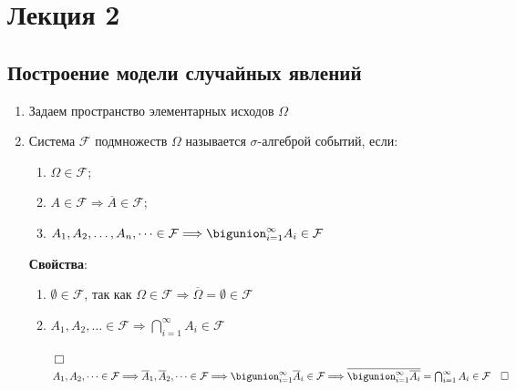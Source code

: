 \documentclass[12pt]{article}
\begin{document}
    \section{Лекция 2}
    
    \subsection{Построение модели случайных явлений}

    \hypertarget{axiomaticdefinitionofprobability}{}

    \begin{enumerate}
        \item Задаем пространство элементарных исходов $\Omega$

        \item \Defs Система $\mathcal{F}$ подмножеств $\Omega$ называется $\sigma$-алгеброй событий, если:

        \begin{enumerate}
            \item $\Omega \in \mathcal{F}$;

            \item $A \in \mathcal{F} \Longrightarrow \overline{A} \in \mathcal{F}$;

            \item $A_1, A_2, \dots, A_n, \dots \in \mathcal{F} \Longrightarrow \bigunion_{i = 1}^\infty A_i \in \mathcal{F}$
        \end{enumerate}

        \textbf{Свойства}:

        \begin{enumerate}
            \item $\emptyset \in \mathcal{F}$, так как $\Omega \in \mathcal{F} \Longrightarrow \overline{\Omega} = \emptyset \in \mathcal{F}$

            \item $A_1, A_2, \dots \in \mathcal{F} \Longrightarrow \bigcap_{i = 1}^\infty A_i \in \mathcal{F}$

            \begin{tcolorbox}
                $\Box \quad$ $A_1, A_2, \dots \in \mathcal{F} \Longrightarrow
                \overline{A}_1, \overline{A}_2, \dots \in \mathcal{F} \Longrightarrow
                \bigunion_{i = 1}^\infty \overline{A}_i \in \mathcal{F} \Longrightarrow
                \overline{\bigunion_{i = 1}^\infty \overline{A_i}} = \bigcap_{i = 1}^\infty A_i \in \mathcal{F} \quad \Box$
            \end{tcolorbox}


\end{enumerate}
\end{enumerate}
\end{document}
